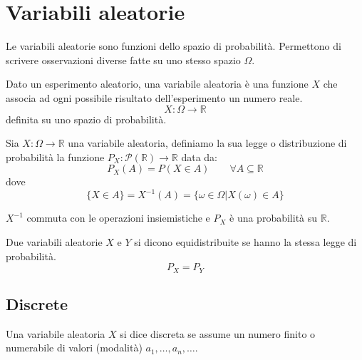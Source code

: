 \newpage
\section{Variabili aleatorie}
Le variabili aleatorie sono funzioni dello spazio di probabilità. Permettono di scrivere osservazioni diverse fatte su uno stesso spazio $\Omega$.
\begin{definition}
	Dato un esperimento aleatorio, una variabile aleatoria è una funzione $X$ che associa ad ogni possibile risultato dell'esperimento un numero reale.
	\begin{equation}
		X : \Omega \to \mathbb{R}
	\end{equation}
	definita su uno spazio di probabilità.
\end{definition}

\begin{definition}
	Sia $X: \Omega \to \mathbb{R}$ una variabile aleatoria, definiamo la sua legge o distribuzione di probabilità la funzione $P_X : \mathcal{P}(\mathbb{R}) \to \mathbb{R}$ data da:
	\begin{equation*}
		P_X(A) = P(X \in A) \qquad \forall A \subseteq \mathbb{R}
	\end{equation*}
	dove
	\begin{equation*}
		\{X\in A\} = X^{-1}(A) = \{\omega \in \Omega \vert X(\omega) \in A\}
	\end{equation*}
\end{definition}

\begin{proposition}
	$X^{-1}$ commuta con le operazioni insiemistiche e $P_X$ è una probabilità su $\mathbb{R}$.
\end{proposition}

\begin{definition}[Equidistribuzione]
	Due variabili aleatorie $X$ e $Y$ si dicono equidistribuite se hanno la stessa legge di probabilità.
	\begin{equation}
		P_X = P_Y
	\end{equation}
\end{definition}

\subsection{Discrete}
\begin{definition}
	Una variabile aleatoria $X$ si dice discreta se assume un numero finito o numerabile di valori (modalità) $a_1, \ldots, a_n, \ldots$.
\end{definition}

